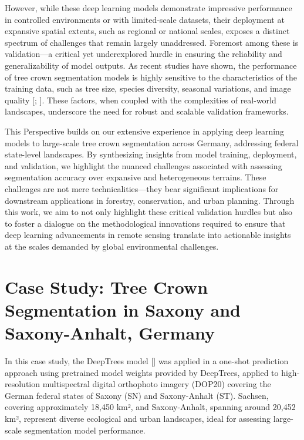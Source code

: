 \documentclass[runningheads]{llncs}
\begin{document}
However, while these deep learning models demonstrate impressive
performance in controlled environments or with limited-scale datasets,
their deployment at expansive spatial extents, such as regional or
national scales, exposes a distinct spectrum of challenges that remain
largely unaddressed. Foremost among these is validation---a critical yet
underexplored hurdle in ensuring the reliability and generalizability of
model outputs. As recent studies have shown, the performance of tree
crown segmentation models is highly sensitive to the characteristics of
the training data, such as tree size, species diversity, seasonal
variations, and image quality {[}\cite{moussaid2021tree};
\cite{cong2022citrus}{]}. These factors, when coupled with the
complexities of real-world landscapes, underscore the need for robust
and scalable validation frameworks.

This Perspective builds on our extensive experience in applying deep
learning models to large-scale tree crown segmentation across Germany,
addressing federal state-level landscapes. By synthesizing insights from
model training, deployment, and validation, we highlight the nuanced
challenges associated with assessing segmentation accuracy over
expansive and heterogeneous terrains. These challenges are not mere
technicalities---they bear significant implications for downstream
applications in forestry, conservation, and urban planning. Through this
work, we aim to not only highlight these critical validation hurdles but
also to foster a dialogue on the methodological innovations required to
ensure that deep learning advancements in remote sensing translate into
actionable insights at the scales demanded by global environmental
challenges.

\section{Case Study: Tree Crown Segmentation in Saxony and
Saxony-Anhalt,
Germany}\label{case-study-tree-crown-segmentation-in-saxony-and-saxony-anhalt-germany}

In this case study, the DeepTrees model {[}\cite{khan2025}{]} was
applied in a one-shot prediction approach using pretrained model weights
provided by DeepTrees, applied to high-resolution multispectral digital
orthophoto imagery (DOP20) covering the German federal states of Saxony
(SN) and Saxony-Anhalt (ST). Sachsen, covering approximately 18,450 km²,
and Saxony-Anhalt, spanning around 20,452 km², represent diverse
ecological and urban landscapes, ideal for assessing large-scale
segmentation model performance.
\end{document}
